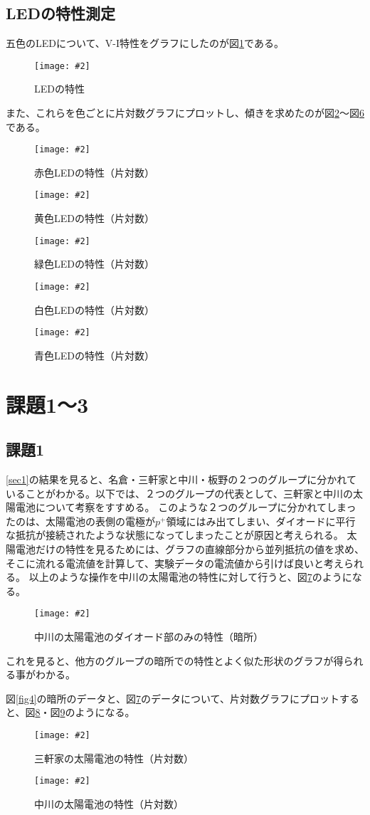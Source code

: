 \documentclass[11pt]{ltjsarticle}
\newcommand{\fg}[3]{
	\begin{figure}
		\texttt{[image: \#2]}
		\caption{#3}
		\label{#1}
	\end{figure}
}
\newcommand{\fr}[1]{図\ref{#1}}
\begin{document}
	\subsection{LEDの特性測定}
		五色のLEDについて、V-I特性をグラフにしたのが\fr{fig8}である。
		\fg{fig8}{resources/led/led.png}{LEDの特性}
		
		また、これらを色ごとに片対数グラフにプロットし、傾きを求めたのが\fr{fig14}〜\fr{fig18}である。
		\fg{fig14}{resources/led/red.png}{赤色LEDの特性（片対数）}
		\fg{fig15}{resources/led/yellow.png}{黄色LEDの特性（片対数）}
		\fg{fig16}{resources/led/green.png}{緑色LEDの特性（片対数）}
		\fg{fig17}{resources/led/white.png}{白色LEDの特性（片対数）}
		\fg{fig18}{resources/led/blue.png}{青色LEDの特性（片対数）}

\section{課題1〜3}
	\subsection{課題1}
		\ref{sec1}の結果を見ると、名倉・三軒家と中川・板野の２つのグループに分かれていることがわかる。以下では、２つのグループの代表として、三軒家と中川の太陽電池について考察をすすめる。
		このような２つのグループに分かれてしまったのは、太陽電池の表側の電極が$p^+$領域にはみ出てしまい、ダイオードに平行な抵抗が接続されたような状態になってしまったことが原因と考えられる。
		太陽電池だけの特性を見るためには、グラフの直線部分から並列抵抗の値を求め、そこに流れる電流値を計算して、実験データの電流値から引けば良いと考えられる。
		以上のような操作を中川の太陽電池の特性に対して行うと、\fr{fig9}のようになる。
		\fg{fig9}{resources/solar/diff/nakagawa.png}{中川の太陽電池のダイオード部のみの特性（暗所）}
		これを見ると、他方のグループの暗所での特性とよく似た形状のグラフが得られる事がわかる。
		
		\fr{fig4}の暗所のデータと、\fr{fig9}のデータについて、片対数グラフにプロットすると、\fr{fig10}・\fr{fig11}のようになる。
		\fg{fig10}{resources/solar/logscale/sangenya.png}{三軒家の太陽電池の特性（片対数）}
		\fg{fig11}{resources/solar/logscale/nakagawa.png}{中川の太陽電池の特性（片対数）}
		
\end{document}
